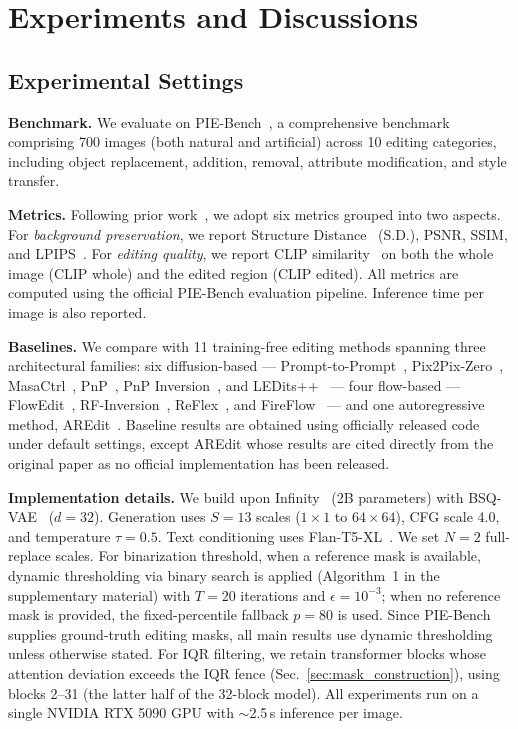 \section{Experiments and Discussions}
\label{section:exp}


\subsection{Experimental Settings}

\noindent\textbf{Benchmark.}
We evaluate on PIE-Bench~\cite{PIEBench}, a comprehensive benchmark comprising 700 images (both natural and artificial) across 10 editing categories, including object replacement, addition, removal, attribute modification, and style transfer.

\noindent\textbf{Metrics.}
Following prior work~\cite{PIEBench,AREdit}, we adopt six metrics grouped into two aspects. For \textit{background preservation}, we report Structure Distance~\cite{PIEBench} (S.D.), PSNR, SSIM, and LPIPS~\cite{LPIPS}. For \textit{editing quality}, we report CLIP similarity~\cite{CLIP} on both the whole image (CLIP whole) and the edited region (CLIP edited). All metrics are computed using the official PIE-Bench evaluation pipeline. Inference time per image is also reported.

\noindent\textbf{Baselines.}
We compare with 11 training-free editing methods spanning three architectural families: six diffusion-based — Prompt-to-Prompt~\cite{prompt2prompt}, Pix2Pix-Zero~\cite{pix2pix-zero}, MasaCtrl~\cite{masactrl}, PnP~\cite{PnP}, PnP Inversion~\cite{PnP_Inversion}, and LEDits++~\cite{LEDits++} — four flow-based — FlowEdit~\cite{Flowedit}, RF-Inversion~\cite{RF-inversion}, ReFlex~\cite{ReFlex}, and FireFlow~\cite{FireFlow} — and one autoregressive method, AREdit~\cite{AREdit}. Baseline results are obtained using officially released code under default settings, except AREdit whose results are cited directly from the original paper as no official implementation has been released.

\noindent\textbf{Implementation details.}
We build upon Infinity~\cite{Infinity} (2B parameters) with BSQ-VAE~\cite{BSQVAE} ($d{=}32$). Generation uses $S{=}13$ scales ($1{\times}1$ to $64{\times}64$), CFG scale 4.0, and temperature $\tau{=}0.5$. Text conditioning uses Flan-T5-XL~\cite{flan-t5}. We set $N{=}2$ full-replace scales. For binarization threshold, when a reference mask is available, dynamic thresholding via binary search is applied (Algorithm~1 in the supplementary material) with $T{=}20$ iterations and $\epsilon{=}10^{-3}$; when no reference mask is provided, the fixed-percentile fallback $p{=}80$ is used. Since PIE-Bench supplies ground-truth editing masks, all main results use dynamic thresholding unless otherwise stated. For IQR filtering, we retain transformer blocks whose attention deviation exceeds the IQR fence (Sec.~\ref{sec:mask_construction}), using blocks 2--31 (the latter half of the 32-block model). All experiments run on a single NVIDIA RTX 5090 GPU with ${\sim}$2.5\,s inference per image.


